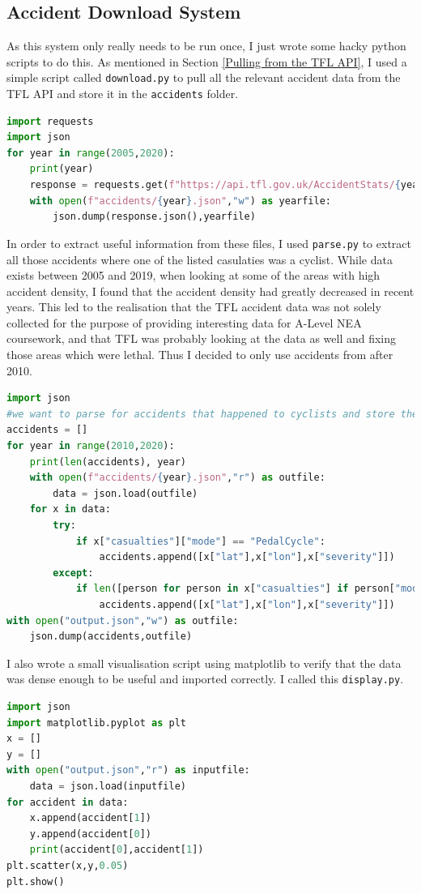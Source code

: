 \documentclass[11pt,twoside,a4paper]{article}
\begin{document}
\subsection{Accident Download System}
\label{Accident Download System Implementation}
As this system only really needs to be run once, I just wrote some hacky python scripts to do this.
As mentioned in Section \ref{Pulling from the TFL API}, I used a simple script called \texttt{download.py} to pull all the relevant accident data from the TFL API and store it in the \texttt{accidents} folder.
\begin{lstlisting}[language=python]
import requests
import json
for year in range(2005,2020):
    print(year)
    response = requests.get(f"https://api.tfl.gov.uk/AccidentStats/{year}")
    with open(f"accidents/{year}.json","w") as yearfile:
        json.dump(response.json(),yearfile)
\end{lstlisting}
In order to extract useful information from these files, I used \texttt{parse.py} to extract all those accidents where one of the listed casulaties was a cyclist. While data exists between 2005 and 2019,
when looking at some of the areas with high accident density, I found that the accident density had greatly decreased in recent years. This led to the realisation that the TFL accident data was not solely collected 
for the purpose of providing interesting data for A-Level NEA coursework, and that TFL was probably looking at the data as well and fixing those areas which were lethal. Thus I decided to only use accidents from after 2010.
\begin{lstlisting}[language=python]
import json
#we want to parse for accidents that happened to cyclists and store the severity and the location
accidents = []
for year in range(2010,2020):
    print(len(accidents), year)
    with open(f"accidents/{year}.json","r") as outfile:
        data = json.load(outfile)
    for x in data:
        try:
            if x["casualties"]["mode"] == "PedalCycle":
                accidents.append([x["lat"],x["lon"],x["severity"]])
        except:
            if len([person for person in x["casualties"] if person["mode"] == "PedalCycle"]) >= 1:
                accidents.append([x["lat"],x["lon"],x["severity"]])
with open("output.json","w") as outfile:
    json.dump(accidents,outfile)
\end{lstlisting}
I also wrote a small visualisation script using matplotlib to verify that the data was dense enough to be useful and imported correctly. I called this \texttt{display.py}. 
\begin{lstlisting}[language=python]
import json
import matplotlib.pyplot as plt
x = []
y = []
with open("output.json","r") as inputfile:
    data = json.load(inputfile)
for accident in data:
    x.append(accident[1])
    y.append(accident[0])
    print(accident[0],accident[1])
plt.scatter(x,y,0.05)
plt.show()
\end{lstlisting}
\end{document}
